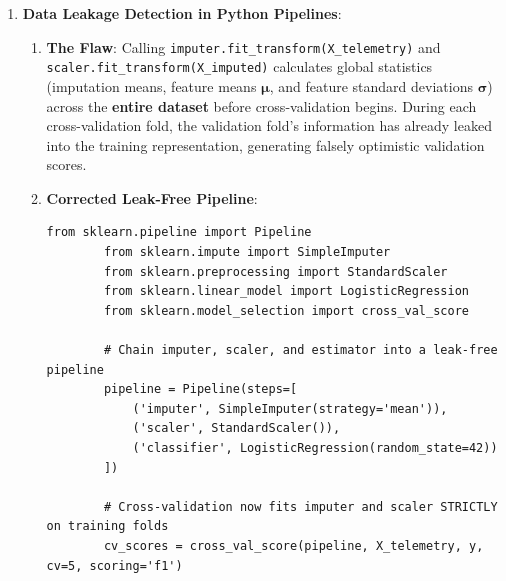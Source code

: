 \begin{enumerate}
    \item \textbf{Data Leakage Detection in Python Pipelines}:
    \begin{enumerate}[label=(\alph*)]
        \item \textbf{The Flaw}: Calling \texttt{imputer.fit\_transform(X\_telemetry)} and \texttt{scaler.fit\_transform(X\_imputed)} calculates global statistics (imputation means, feature means $\boldsymbol{\mu}$, and feature standard deviations $\boldsymbol{\sigma}$) across the \textbf{entire dataset} before cross-validation begins. During each cross-validation fold, the validation fold's information has already leaked into the training representation, generating falsely optimistic validation scores.
        \item \textbf{Corrected Leak-Free Pipeline}:
        \begin{lstlisting}[style=pythonstyle]
        from sklearn.pipeline import Pipeline
        from sklearn.impute import SimpleImputer
        from sklearn.preprocessing import StandardScaler
        from sklearn.linear_model import LogisticRegression
        from sklearn.model_selection import cross_val_score

        # Chain imputer, scaler, and estimator into a leak-free pipeline
        pipeline = Pipeline(steps=[
            ('imputer', SimpleImputer(strategy='mean')),
            ('scaler', StandardScaler()),
            ('classifier', LogisticRegression(random_state=42))
        ])

        # Cross-validation now fits imputer and scaler STRICTLY on training folds
        cv_scores = cross_val_score(pipeline, X_telemetry, y, cv=5, scoring='f1')
        \end{lstlisting}
    \end{enumerate}
\end{enumerate}
